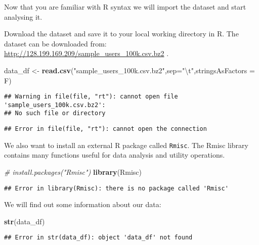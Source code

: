 \documentclass[]{article}
\newenvironment{Shaded}{\begin{snugshade}}{\end{snugshade}}
\newcommand{\CharTok}[1]{\textcolor[rgb]{0.31,0.60,0.02}{#1}}
\newcommand{\CommentTok}[1]{\textcolor[rgb]{0.56,0.35,0.01}{\textit{#1}}}
\newcommand{\DataTypeTok}[1]{\textcolor[rgb]{0.13,0.29,0.53}{#1}}
\newcommand{\KeywordTok}[1]{\textcolor[rgb]{0.13,0.29,0.53}{\textbf{#1}}}
\newcommand{\NormalTok}[1]{#1}
\newcommand{\StringTok}[1]{\textcolor[rgb]{0.31,0.60,0.02}{#1}}
\begin{document}
Now that you are familiar with R syntax we will import the dataset and
start analysing it.

Download the dataset and save it to your local working directory in R.
The dataset can be downloaded from:
\url{http://128.199.169.209/sample_users_100k.csv.bz2} .

\begin{Shaded}
\begin{Highlighting}[]
\NormalTok{data_df <-}\StringTok{ }\KeywordTok{read.csv}\NormalTok{(}\StringTok{"sample_users_100k.csv.bz2"}\NormalTok{,}\DataTypeTok{sep=}\StringTok{"}\CharTok{\textbackslash{}t}\StringTok{"}\NormalTok{,}\DataTypeTok{stringsAsFactors =}\NormalTok{ F)}
\end{Highlighting}
\end{Shaded}

\begin{verbatim}
## Warning in file(file, "rt"): cannot open file 'sample_users_100k.csv.bz2':
## No such file or directory
\end{verbatim}

\begin{verbatim}
## Error in file(file, "rt"): cannot open the connection
\end{verbatim}

We also want to install an external R package called \texttt{Rmisc}. The
Rmisc library contains many functions useful for data analysis and
utility operations.

\begin{Shaded}
\begin{Highlighting}[]
\CommentTok{# install.packages("Rmisc")}
\KeywordTok{library}\NormalTok{(Rmisc)}
\end{Highlighting}
\end{Shaded}

\begin{verbatim}
## Error in library(Rmisc): there is no package called 'Rmisc'
\end{verbatim}

We will find out some information about our data:

\begin{Shaded}
\begin{Highlighting}[]
\KeywordTok{str}\NormalTok{(data_df)}
\end{Highlighting}
\end{Shaded}

\begin{verbatim}
## Error in str(data_df): object 'data_df' not found
\end{verbatim}
\end{document}
